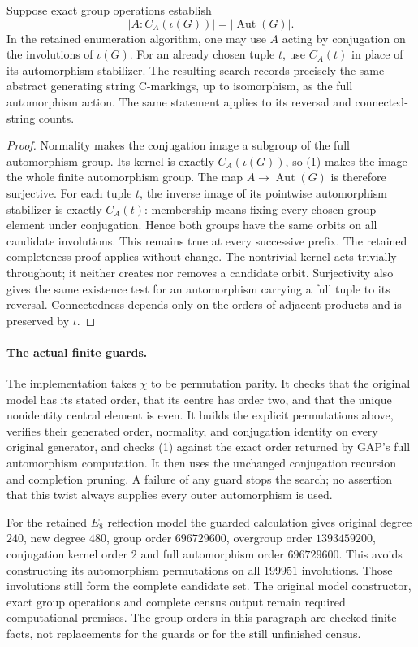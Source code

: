 \documentclass[11pt,a4paper]{article}
\begin{document}
\begin{proposition}
Suppose exact group operations establish
\[
 |A:C_A(\iota(G))|=|\operatorname{Aut}(G)|.                 \tag{1}
\]
In the retained enumeration algorithm, one may use $A$ acting by
conjugation on the involutions of $\iota(G)$. For an already chosen
tuple $t$, use $C_A(t)$ in place of its automorphism stabilizer.
The resulting search records precisely the same abstract generating
string C-markings, up to isomorphism, as the full automorphism action.
The same statement applies to its reversal and connected-string counts.
\end{proposition}
\begin{proof}
Normality makes the conjugation image a subgroup of the full automorphism
group. Its kernel is exactly $C_A(\iota(G))$, so (1) makes the image the
whole finite automorphism group. The map $A\to\operatorname{Aut}(G)$
is therefore surjective. For each tuple $t$, the inverse image of its
pointwise automorphism stabilizer is exactly $C_A(t)$: membership means
fixing every chosen group element under conjugation. Hence both groups
have the same orbits on all candidate involutions. This remains true at
every successive prefix. The retained completeness proof applies without
change. The nontrivial kernel acts trivially throughout; it neither creates
nor removes a candidate orbit. Surjectivity also gives the same existence
test for an automorphism carrying a full tuple to its reversal. Connectedness
depends only on the orders of adjacent products and is preserved by $\iota$.
\end{proof}

\paragraph{The actual finite guards.}
The implementation takes $\chi$ to be permutation parity. It checks that
the original model has its stated order, that its centre has order two,
and that the unique nonidentity central element is even. It builds the
explicit permutations above, verifies their generated order, normality,
and conjugation identity on every original generator, and checks (1)
against the exact order returned by GAP's full automorphism computation.
It then uses the unchanged conjugation recursion and completion pruning.
A failure of any guard stops the search; no assertion that this twist
always supplies every outer automorphism is used.

For the retained $E_8$ reflection model the guarded calculation gives
original degree $240$, new degree $480$, group order $696729600$,
overgroup order $1393459200$, conjugation kernel order $2$ and full
automorphism order $696729600$. This avoids constructing its automorphism
permutations on all $199951$ involutions. Those involutions still form the
complete candidate set. The original model constructor, exact group
operations and complete census output remain required computational
premises. The group orders in this paragraph are checked finite facts,
not replacements for the guards or for the still unfinished census.
\end{document}
